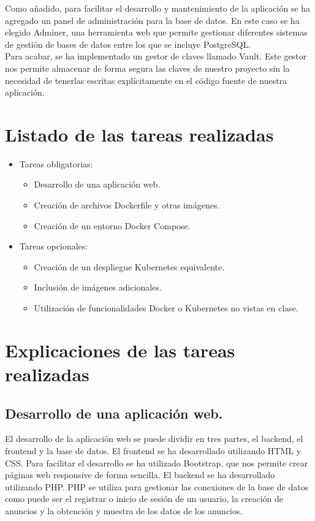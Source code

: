 \documentclass{report}
\begin{document}
        Como añadido, para facilitar el desarrollo y mantenimiento de la aplicación se ha agregado un panel de administración para la base de datos.
        En este caso se ha elegido Adminer, una herramienta web que permite gestionar diferentes sistemas de gestión de bases de datos entre los que se incluye PostgreSQL.\\

        Para acabar, se ha implementado un gestor de claves llamado Vault. Este gestor nos permite almacenar de forma segura las claves de nuestro proyecto sin la necesidad de tenerlas escritas explícitamente en el código fuente de nuestra aplicación.\\
    \chapter{Listado de las tareas realizadas}
        \begin{itemize}
            \item Tareas obligatorias:
            \begin{itemize}
                \item Desarrollo de una aplicación web. \checkmark
                \item Creación de archivos Dockerfile y otras imágenes. \checkmark
                \item Creación de un entorno Docker Compose. \checkmark
            \end{itemize}
            \item Tareas opcionales:
            \begin{itemize}
                \item Creación de un despliegue Kubernetes equivalente. \checkmark
                \item Inclusión de imágenes adicionales. \checkmark
                \item Utilización de funcionalidades Docker o Kubernetes no vistas en clase. \checkmark
            \end{itemize}
        \end{itemize}
    \chapter{Explicaciones de las tareas realizadas}
        \section{Desarrollo de una aplicación web.}
            El desarrollo de la aplicación web se puede dividir en tres partes, el backend, el frontend y la base de datos.
            El frontend se ha desarrollado utilizando HTML y CSS.
            Para facilitar el desarrollo se ha utilizado Bootstrap, que nos permite crear páginas web responsive de forma sencilla.
            El backend se ha desarrollado utilizando PHP.
            PHP se utiliza para gestionar las conexiones de la base de datos como puede ser el registrar o inicio de sesión de un usuario, la creación de anuncios y la obtención y muestra de los datos de los anuncios.\\
            
\end{document}
